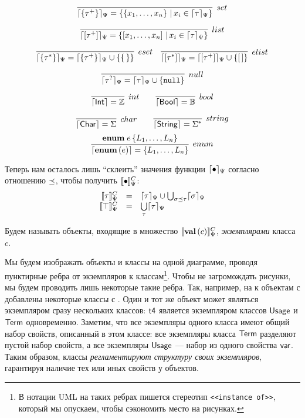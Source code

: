 $$
\infer[set]{
	\semRC{\SetT{\tau^+}} = \left\{ \Set{x_1,\ldots,x_n} \,|\, x_i \in \semRC{\tau}\right\}
}{
}
$$ 

$$
\infer[list]{
	\semRC{\ListT{\tau^+}} = \left\{ \List{x_1,\ldots,x_n} \,|\, x_i \in \semRC{\tau}\right\}
}{
}
$$ 

$$
\infer[eset]{
	\semRC{\SetT{\tau^*}} = \semRC{\SetT{\tau^+}} \cup \left\{ \Set{\,} \right\}
}{
}	
\quad
\infer[elist]{
	\semRC{\ListT{\tau^*}} = \semRC{\ListT{\tau^+}} \cup \left\{ \List{\,} \right\}
}{
}	
$$ 

$$
\infer[null]{
	\semRC{\NullableT{\tau}} = \semRC{\tau} \cup \{\Null\}
}{
}
$$

$$
\infer[int]{
	\sem{\IntegerT} = \mathbb{Z}
}{
}\qquad
\infer[bool]{
	\sem{\BooleanT} = \mathbb{B}
}{
}
$$

$$
\infer[char]{
	\sem{\CharT} = \Sigma
}{
}\qquad
\infer[string]{
	\sem{\StringT} = \Sigma^*
}{
}
$$ $$
\infer[enum]{
	\sem{\EnumT{e}} = \{L_1, \ldots, L_n\}
}{
	\Enum{e}{L_1, \ldots, L_n}
}
$$

Теперь нам осталось лишь ``склеить'' значения функции $\lceil \bullet \rceil_\Psi$ согласно отношению $\preceq$, чтобы получить $[\![\bullet]\!]_\Psi^C$:
$$
\begin{array}{rcl}
	\denotRCC{\tau} &=& \semRC{\tau} \cup \bigcup_{\sigma \subtype \tau} \semRC{\sigma}\\
	\denotRCC{\top} &=& \bigcup\limits_\tau \semRC{\tau}\\
\end{array}	
$$

\begin{Def}
Будем называть объекты, входящие в множество $[\![\mathbf{val}\left(c\right)]\!]_\Psi^C$, \emph{экземплярами} класса $c$.
\end{Def}

Мы будем изображать объекты и классы на одной диаграмме, проводя пунктирные ребра от экземпляров к классам\footnote{В нотации UML на таких ребрах пишется стереотип \texttt{\scriptsize<<instance of>>}, который мы опускаем, чтобы сэкономить место на рисунках.}. Чтобы не загромождать рисунки, мы будем проводить лишь некоторые такие ребра. Так, например, на  к объектам с  добавлены некоторые классы с .
%
%
%
Один и тот же объект может являться экземпляром сразу нескольких классов: $\mathsf{t4}$ является экземпляром классов $\mathsf{Usage}$ и $\mathsf{Term}$ одновременно. Заметим, что все экземпляры одного класса имеют общий набор свойств, описанный в этом классе: все экземпляры класса $\mathsf{Term}$ разделяют пустой набор свойств, а все экземпляры $\mathsf{Usage}$ --- набор из одного свойства $\mathsf{var}$. Таким образом, классы \emph{регламентируют структуру своих экземпляров}, гарантируя наличие тех или иных свойств у объектов.

